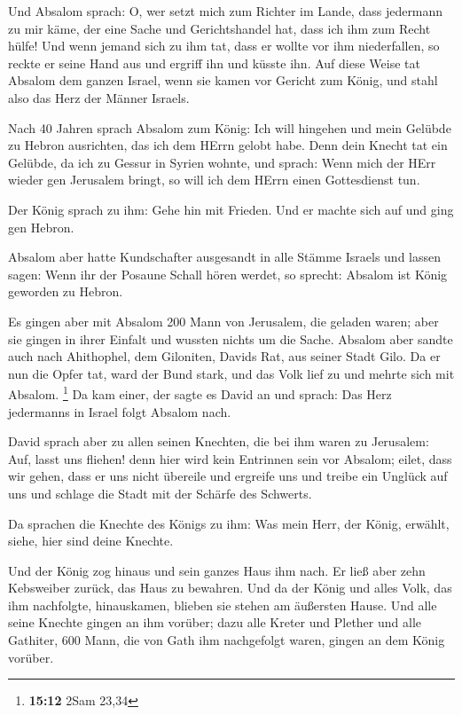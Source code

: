  Und Absalom sprach: O, wer setzt mich zum Richter im Lande,
dass jedermann zu mir käme, der eine Sache und Gerichtshandel hat, dass
ich ihm zum Recht hülfe!  Und wenn jemand sich zu ihm tat,
dass er wollte vor ihm niederfallen, so reckte er seine Hand aus und
ergriff ihn und küsste ihn.  Auf diese Weise tat Absalom dem
ganzen Israel, wenn sie kamen vor Gericht zum König, und stahl also das
Herz der Männer Israels.

 Nach 40 Jahren sprach Absalom zum König: Ich will hingehen
und mein Gelübde zu Hebron ausrichten, das ich dem HErrn gelobt habe.
 Denn dein Knecht tat ein Gelübde, da ich zu Gessur in
Syrien wohnte, und sprach: Wenn mich der HErr wieder gen Jerusalem
bringt, so will ich dem HErrn einen Gottesdienst tun.

 Der König sprach zu ihm: Gehe hin mit Frieden. Und er
machte sich auf und ging gen Hebron.

 Absalom aber hatte Kundschafter ausgesandt in alle Stämme
Israels und lassen sagen: Wenn ihr der Posaune Schall hören werdet, so
sprecht: Absalom ist König geworden zu Hebron.

 Es gingen aber mit Absalom 200 Mann von Jerusalem, die
geladen waren; aber sie gingen in ihrer Einfalt und wussten nichts um
die Sache.  Absalom aber sandte auch nach Ahithophel, dem
Giloniten, Davids Rat, aus seiner Stadt Gilo. Da er nun die Opfer tat,
ward der Bund stark, und das Volk lief zu und mehrte sich mit Absalom.
\footnote{\textbf{15:12} 2Sam 23,34}  Da kam einer, der
sagte es David an und sprach: Das Herz jedermanns in Israel folgt
Absalom nach.

 David sprach aber zu allen seinen Knechten, die bei ihm
waren zu Jerusalem: Auf, lasst uns fliehen! denn hier wird kein
Entrinnen sein vor Absalom; eilet, dass wir gehen, dass er uns nicht
übereile und ergreife uns und treibe ein Unglück auf uns und schlage die
Stadt mit der Schärfe des Schwerts.

 Da sprachen die Knechte des Königs zu ihm: Was mein Herr,
der König, erwählt, siehe, hier sind deine Knechte.

 Und der König zog hinaus und sein ganzes Haus ihm nach. Er
ließ aber zehn Kebsweiber zurück, das Haus zu bewahren. 
Und da der König und alles Volk, das ihm nachfolgte, hinauskamen,
blieben sie stehen am äußersten Hause.  Und alle seine
Knechte gingen an ihm vorüber; dazu alle Kreter und Plether und alle
Gathiter, 600 Mann, die von Gath ihm nachgefolgt waren, gingen an dem
König vorüber.

